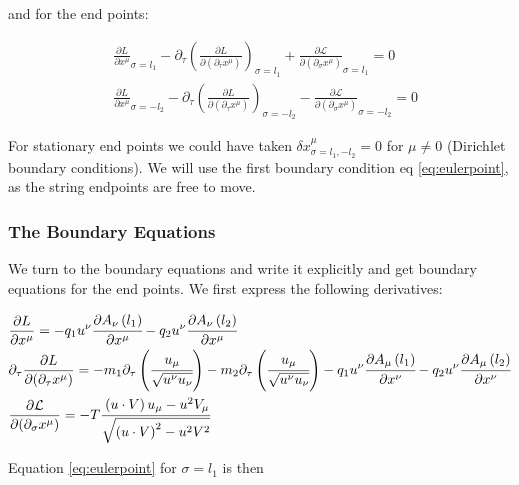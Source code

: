 \documentclass[11pt,a4paper]{article}
\begin{document}
and for the end points:

\begin{subequations}
\label{eq:eulerpoint}
\begin{align}
&\frac{\partial L}{\partial x^{\mu}}_{\sigma=l_{1}}-\partial_{\tau}\left(\frac{\partial L}{\partial(\partial_{\tau}x^{\mu})}\right)_{\sigma=l_{1}}+\frac{\partial\mathcal{L}}{\partial(\partial_{\sigma}x^{\mu})}_{\sigma=l_{1}}=0
\\
&\frac{\partial L}{\partial x^{\mu}}_{\sigma=-l_{2}}-\partial_{\tau}\left(\frac{\partial L}{\partial(\partial_{\tau}x^{\mu})}\right)_{\sigma=-l_{2}}-\frac{\partial\mathcal{L}}{\partial(\partial_{\sigma}x^{\mu})}_{\sigma=-l_{2}}=0
\end{align}
\end{subequations}

For stationary end points we could have taken $\delta x^{\mu}_{\sigma=l_1,-l_2}=0$ for $\mu\neq0$ (Dirichlet boundary conditions). We will use the first boundary condition eq \ref{eq:eulerpoint}, as the string endpoints are free to move.

\FloatBarrier
\subsubsection{The Boundary Equations}
\label{sec:boundaryequations}

We turn to the boundary equations and write it explicitly and get boundary equations for the end points.
We first express the following derivatives:

\begin{align}
&\frac{\partial L}{\partial x^{\mu}}=-q_{1}u^{\nu}\cfrac{\partial A_{\nu}\left(l_{1}\right)}{\partial x^{\mu}}-q_{2}u^{\nu}\cfrac{\partial A_{\nu}\left(l_{2}\right)}{\partial x^{\mu}} \\
&\partial_{\tau}\frac{\partial L}{\partial(\partial_{\tau}x^{\mu})}=-m_{1}\partial_{\tau}\left(\cfrac{u_{\mu}}{\sqrt{u^{\nu}u_{\nu}}}\right)-m_{2}\partial_{\tau}\left(\cfrac{u_{\mu}}{\sqrt{u^{\nu}u_{\nu}}}\right)-q_{1}u^{\nu}\cfrac{\partial A_{\mu}\left(l_{1}\right)}{\partial x^{\nu}}-q_{2}u^{\nu}\cfrac{\partial A_{\mu}\left(l_{2}\right)}{\partial x^{\nu}} \\
&\frac{\partial\mathcal{L}}{\partial(\partial_{\sigma}x^{\mu})}=-T\cfrac{\left(u\cdot V\right)u_{\mu}-u^{2}V_{\mu}}{\sqrt{\left(u\cdot V\right)^{2}-u^{2}V^{2}}}
\end{align}

Equation \ref{eq:eulerpoint} for $ \sigma=l_1 $ is then
\end{document}
